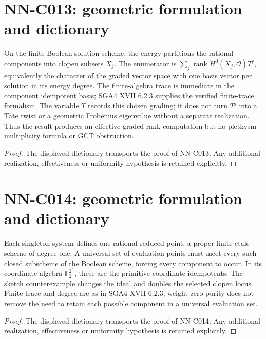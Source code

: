 \section{NN-C013: geometric formulation and dictionary}
\begin{geometricstatement}[NN-C013]
On the finite Boolean solution scheme, the energy partitions the rational components into clopen subsets $X_j$. The enumerator is $\sum_j\operatorname{rank}H^0(X_j,\mathcal O)T^j$, equivalently the character of the graded vector space with one basis vector per solution in its energy degree. The finite-algebra trace is immediate in the component idempotent basis; SGA4 XVII 6.2.3 supplies the verified finite-trace formalism. The variable $T$ records this chosen grading; it does not turn $T^j$ into a Tate twist or a geometric Frobenius eigenvalue without a separate realization. Thus the result produces an effective graded rank computation but no plethysm multiplicity formula or GCT obstruction.
\end{geometricstatement}
\begin{proof} The displayed dictionary transports the proof of NN-C013. Any additional realization, effectiveness or uniformity hypothesis is retained explicitly.\end{proof}


\section{NN-C014: geometric formulation and dictionary}
\begin{geometricstatement}[NN-C014]
Each singleton system defines one rational reduced point, a proper finite etale scheme of degree one. A universal set of evaluation points must meet every such closed subscheme of the Boolean scheme, forcing every component to occur. In its coordinate algebra $\mathbb F_2^{2^n}$, these are the primitive coordinate idempotents. The sketch counterexample changes the ideal and doubles the selected clopen locus. Finite trace and degree are as in SGA4 XVII 6.2.3; weight-zero purity does not remove the need to retain each possible component in a universal evaluation set.
\end{geometricstatement}
\begin{proof} The displayed dictionary transports the proof of NN-C014. Any additional realization, effectiveness or uniformity hypothesis is retained explicitly.\end{proof}


